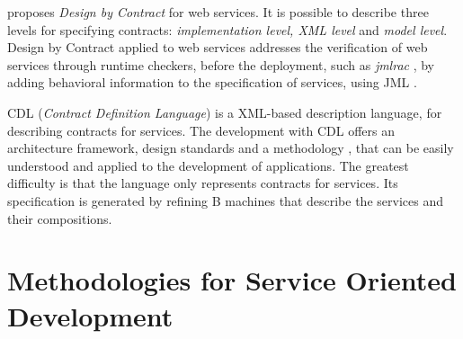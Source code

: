 \cite{HL05TACoS} proposes \textit{Design by Contract} for web services. It is
possible to describe three levels for specifying contracts: \textit{implementation level,
XML level} and \textit{model level}. Design by Contract applied to web services
addresses the verification of web services through runtime checkers,
before the deployment, such as \textit{jmlrac} \cite{LeavensCCRC02}, by adding behavioral
information to the specification of services, using JML \cite{LeavensCCRC02}.

CDL (\textit{Contract Definition Language}) \cite{Milanovic2006} is a XML-based
description language, for describing contracts for services. The
development with CDL offers an architecture framework, design standards and a
methodology \cite{MilanovicM05,Milanovic05,Milanovic06,MilanovicM06}, that can
be easily understood and applied to the development of applications. The
greatest difficulty is that the language only
represents contracts for services. Its specification is generated by
refining B \cite{AbrialLNSS91} machines that describe
the services and their compositions. 

% 



\section{Methodologies for Service Oriented Development}
\label{sec:metodologies}



